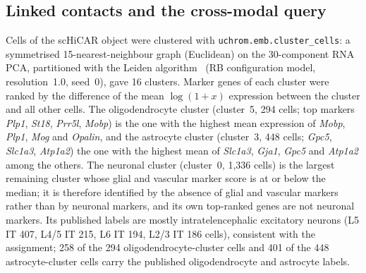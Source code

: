\documentclass[11pt]{article}
\newcommand{\pkg}[1]{\texttt{#1}}
\begin{document}
\subsection*{Linked contacts and the cross-modal query}
Cells of the scHiCAR object were clustered with \pkg{uchrom.emb.cluster\_cells}: a symmetrised 15-nearest-neighbour graph (Euclidean) on the 30-component RNA PCA, partitioned with the Leiden algorithm~\citep{leiden} (RB configuration model, resolution~1.0, seed~0), gave 16 clusters.
Marker genes of each cluster were ranked by the difference of the mean $\log(1+x)$ expression between the cluster and all other cells.
The oligodendrocyte cluster (cluster~5, 294 cells; top markers \emph{Plp1}, \emph{St18}, \emph{Prr5l}, \emph{Mobp}) is the one with the highest mean expression of \emph{Mobp}, \emph{Plp1}, \emph{Mog} and \emph{Opalin}, and the astrocyte cluster (cluster~3, 448 cells; \emph{Gpc5}, \emph{Slc1a3}, \emph{Atp1a2}) the one with the highest mean of \emph{Slc1a3}, \emph{Gja1}, \emph{Gpc5} and \emph{Atp1a2} among the others.
The neuronal cluster (cluster~0, 1,336 cells) is the largest remaining cluster whose glial and vascular marker score is at or below the median; it is therefore identified by the absence of glial and vascular markers rather than by neuronal markers, and its own top-ranked genes are not neuronal markers.
Its published labels are mostly intratelencephalic excitatory neurons (L5 IT 407, L4/5 IT 215, L6 IT 194, L2/3 IT 186 cells), consistent with the assignment; 258 of the 294 oligodendrocyte-cluster cells and 401 of the 448 astrocyte-cluster cells carry the published oligodendrocyte and astrocyte labels.
\end{document}
